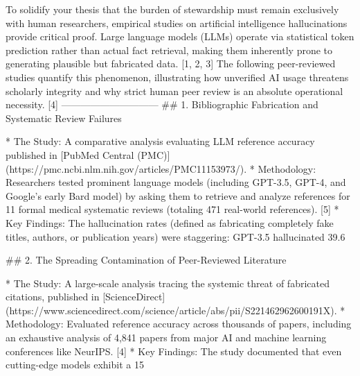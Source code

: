 To solidify your thesis that the burden of stewardship must remain exclusively with human researchers, empirical studies on artificial intelligence hallucinations provide critical proof. Large language models (LLMs) operate via statistical token prediction rather than actual fact retrieval, making them inherently prone to generating plausible but fabricated data. [1, 2, 3] 
The following peer-reviewed studies quantify this phenomenon, illustrating how unverified AI usage threatens scholarly integrity and why strict human peer review is an absolute operational necessity. [4] 
------------------------------
## 1. Bibliographic Fabrication and Systematic Review Failures

* The Study: A comparative analysis evaluating LLM reference accuracy published in [PubMed Central (PMC)](https://pmc.ncbi.nlm.nih.gov/articles/PMC11153973/).
* Methodology: Researchers tested prominent language models (including GPT-3.5, GPT-4, and Google’s early Bard model) by asking them to retrieve and analyze references for 11 formal medical systematic reviews (totaling 471 real-world references). [5] 
* Key Findings: The hallucination rates (defined as fabricating completely fake titles, authors, or publication years) were staggering: GPT-3.5 hallucinated 39.6%

## 2. The Spreading Contamination of Peer-Reviewed Literature

* The Study: A large-scale analysis tracing the systemic threat of fabricated citations, published in [ScienceDirect](https://www.sciencedirect.com/science/article/abs/pii/S221462962600191X).
* Methodology: Evaluated reference accuracy across thousands of papers, including an exhaustive analysis of 4,841 papers from major AI and machine learning conferences like NeurIPS. [4] 
* Key Findings: The study documented that even cutting-edge models exhibit a 15%


